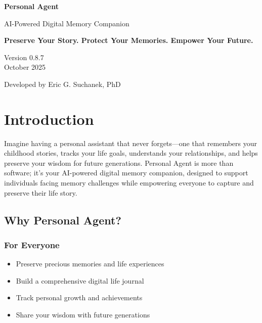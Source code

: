 \documentclass[11pt,letterpaper]{article}
\begin{document}
\begin{titlepage}
\centering
\vspace*{2cm}

{\Huge\bfseries\color{primaryblue} Personal Agent\par}
\vspace{0.5cm}
{\Large\color{secondarygreen} AI-Powered Digital Memory Companion\par}
\vspace{2cm}

{\LARGE\textbf{Preserve Your Story. Protect Your Memories. Empower Your Future.}\par}

\vfill

{\large Version 0.8.7 \\ October 2025\par}
\vspace{1cm}

{\large Developed by Eric G. Suchanek, PhD\par}

\end{titlepage}

\tableofcontents
\newpage

\section{Introduction}

Imagine having a personal assistant that never forgets---one that remembers your childhood stories, tracks your life goals, understands your relationships, and helps preserve your wisdom for future generations. Personal Agent is more than software; it's your AI-powered digital memory companion, designed to support individuals facing memory challenges while empowering everyone to capture and preserve their life story.

\subsection{Why Personal Agent?}

\subsubsection{For Everyone}
\begin{itemize}[leftmargin=*]
    \item Preserve precious memories and life experiences
    \item Build a comprehensive digital life journal
    \item Track personal growth and achievements
    \item Share your wisdom with future generations
\end{itemize}
\end{document}
